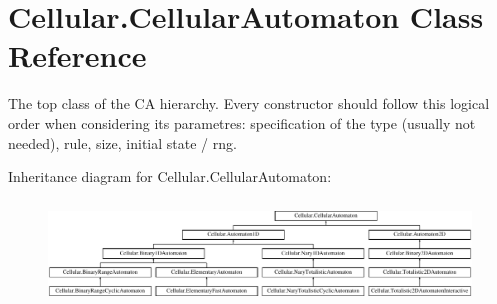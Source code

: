 \hypertarget{class_cellular_1_1_cellular_automaton}{}\section{Cellular.\+Cellular\+Automaton Class Reference}
\label{class_cellular_1_1_cellular_automaton}


The top class of the C\+A hierarchy. Every constructor should follow this logical order when considering its parametres\+: specification of the type (usually not needed), rule, size, initial state / rng.  


Inheritance diagram for Cellular.\+Cellular\+Automaton\+:\begin{figure}[H]
\begin{center}
\leavevmode
\includegraphics[height=2.788845cm]{class_cellular_1_1_cellular_automaton}
\end{center}
\end{figure}
